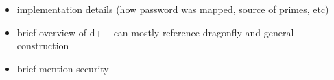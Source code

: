 

\begin{itemize}
    \item implementation details (how password was mapped, source of primes, etc)
    \item brief overview of d+ -- can mostly reference dragonfly and general construction
    \item brief mention security
\end{itemize}
